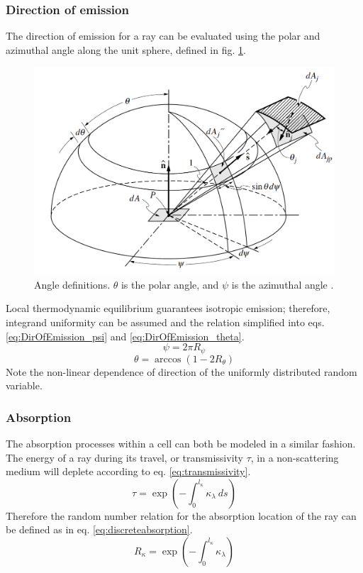 \subsubsection{Direction of emission}
The direction of emission for a ray can be evaluated using the polar and azimuthal angle along the unit sphere, defined in fig. \ref{fig:Unit_Sphere}. 
\begin{figure}
\includegraphics[width=\linewidth]{figures/ch3/solid_angl.png}
\caption{Angle definitions. $\theta$ is the polar angle, and $\psi$ is the azimuthal angle \cite{Modest2013RadiativeTransfer}. }
\label{fig:Unit_Sphere}
\end{figure}

Local thermodynamic equilibrium guarantees isotropic emission; therefore, integrand uniformity can be assumed and the relation simplified into eqs. \ref{eq:DirOfEmission_psi} and \ref{eq:DirOfEmission_theta}.
\begin{equation}
    \psi{} = 2\pi{}R_\psi{}
    \label{eq:DirOfEmission_psi}
\end{equation}
\begin{equation}
    \theta{}=\arccos{(1-2R_\theta{})}
    \label{eq:DirOfEmission_theta}
\end{equation}
Note the non-linear dependence of direction of the uniformly distributed random variable.

\subsubsection{Absorption}
The absorption processes within a cell can both be modeled in a similar fashion. The energy of a ray during its travel, or transmissivity $\tau{}$, in a non-scattering medium will deplete according to eq. \ref{eq:transmissivity}.
\begin{equation}
    \tau{}=\exp{\left(-\int^{l_\kappa{}}_0\kappa{}_\lambda{}~ds\right)}
    \label{eq:transmissivity}
\end{equation}
Therefore the random number relation for the absorption location of the ray can be defined as in eq. \ref{eq:discreteabsorption}.
\begin{equation}
    R_\kappa{}=\exp{\left(-\int_0^{l_\kappa}\kappa_\lambda{}\right)}
    \label{eq:discreteabsorption}
\end{equation}

